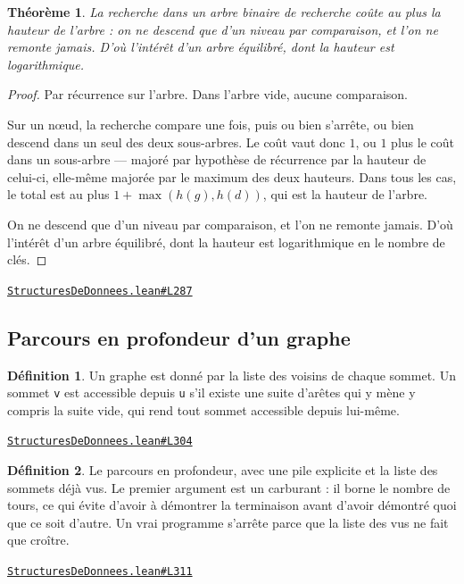 \documentclass[11pt,a4paper]{article}
\theoremstyle{definition}
\newtheorem{definition}{Définition}
\theoremstyle{plain}
\newtheorem{theoreme}{Théorème}
\newcommand{\source}[2]{\par\smallskip\noindent\hfill{\footnotesize\href{#1}{\texttt{#2}}}\par\smallskip}
\begin{document}
\begin{theoreme}
La recherche dans un arbre binaire de recherche coûte au plus la hauteur de
l'arbre : on ne descend que d'un niveau par comparaison, et l'on ne remonte jamais.
D'où l'intérêt d'un arbre équilibré, dont la hauteur est logarithmique.
\end{theoreme}
\begin{proof}
Par récurrence sur l'arbre. Dans l'arbre vide, aucune comparaison.

Sur un nœud, la recherche compare une fois, puis ou bien s'arrête, ou bien descend dans
un seul des deux sous-arbres. Le coût vaut donc \(1\), ou \(1\) plus le coût dans un
sous-arbre — majoré par hypothèse de récurrence par la hauteur de celui-ci, elle-même
majorée par le maximum des deux hauteurs. Dans tous les cas, le total est au plus
\(1 + \max(h(g), h(d))\), qui est la hauteur de l'arbre.

On ne descend que d'un niveau par comparaison, et l'on ne remonte jamais. D'où l'intérêt
d'un arbre équilibré, dont la hauteur est logarithmique en le nombre de clés.
\end{proof}
\source{https://github.com/Commutator-IO/learn-lean/blob/main/courses/02-lycee/11-informatique-nsi/StructuresDeDonnees.lean\#L287}{StructuresDeDonnees.lean\#L287}

\subsection{Parcours en profondeur d'un graphe}

\begin{definition}
Un graphe est donné par la liste des voisins de chaque sommet. Un sommet \texttt{v} est
accessible depuis \texttt{u} s'il existe une suite d'arêtes qui y mène \textemdash{} y compris la suite
vide, qui rend tout sommet accessible depuis lui-même.
\end{definition}
\source{https://github.com/Commutator-IO/learn-lean/blob/main/courses/02-lycee/11-informatique-nsi/StructuresDeDonnees.lean\#L304}{StructuresDeDonnees.lean\#L304}

\begin{definition}
Le parcours en profondeur, avec une pile explicite et la liste des sommets déjà
vus. Le premier argument est un carburant : il borne le nombre de tours, ce qui évite
d'avoir à démontrer la terminaison avant d'avoir démontré quoi que ce soit d'autre.
Un vrai programme s'arrête parce que la liste des vus ne fait que croître.
\end{definition}
\source{https://github.com/Commutator-IO/learn-lean/blob/main/courses/02-lycee/11-informatique-nsi/StructuresDeDonnees.lean\#L311}{StructuresDeDonnees.lean\#L311}
\end{document}
